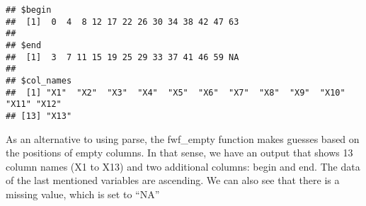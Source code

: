 \documentclass[
]{article}
\begin{document}
\begin{verbatim}
## $begin
##  [1]  0  4  8 12 17 22 26 30 34 38 42 47 63
## 
## $end
##  [1]  3  7 11 15 19 25 29 33 37 41 46 59 NA
## 
## $col_names
##  [1] "X1"  "X2"  "X3"  "X4"  "X5"  "X6"  "X7"  "X8"  "X9"  "X10" "X11" "X12"
## [13] "X13"
\end{verbatim}

As an alternative to using parse, the fwf\_empty function makes guesses
based on the positions of empty columns. In that sense, we have an
output that shows 13 column names (X1 to X13) and two additional
columns: begin and end. The data of the last mentioned variables are
ascending. We can also see that there is a missing value, which is set
to ``NA''

\pagebreak
\end{document}
